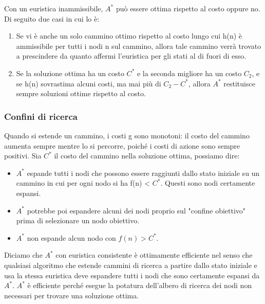 \documentclass{article}
\begin{document}
\noindent Con un euristica inammissibile, $A^*$ può essere ottima rispetto al costo oppure no. Di seguito due casi in cui lo è: 
\begin{enumerate}
    \item Se vi è anche un solo cammino ottimo rispetto al costo lungo cui h(n) è ammissibile per tutti i nodi n sul cammino, allora tale cammino verrà trovato a prescindere da quanto affermi l'euristica per gli stati al di fuori di esso. 
    \item Se la soluzione ottima ha un costo $C^*$ e la seconda migliore ha un costo $C_2$, e se h(n) sovrastima alcuni costi, ma mai più di $C_2-C^*$, allora $A^*$ restituisce sempre soluzioni ottime rispetto al costo.
\end{enumerate}
\newpage
\subsubsection{Confini di ricerca}
Quando si estende un cammino, i costi g sono monotoni: il costo del cammino aumenta sempre mentre lo si percorre, poiché i costi di azione sono sempre positivi. \newline
Sia $C^*$ il costo del cammino nella soluzione ottima, possiamo dire:
\begin{itemize}
    \item $A^*$ espande tutti i nodi che possono essere raggiunti dallo stato iniziale su un cammino in cui per ogni nodo si ha f(n) < $C^*$. Questi sono nodi certamente espansi.
    \item $A^*$ potrebbe poi espandere alcuni dei nodi proprio sul "confine obiettivo" prima di selezionare un nodo obiettivo.
    \item $A^*$ non espande alcun nodo con $f(n)>C^*$.
\end{itemize}
Diciamo che $A^*$ con euristica consistente è ottimamente efficiente nel senso che qualsiasi algoritmo che estende cammini di ricerca a partire dallo stato iniziale e usa la stessa euristica deve espandere tutti i nodi che sono certamente espansi da $A^*$.\newline
$A^*$ è efficiente perché esegue la potatura dell'albero di ricerca dei nodi non necessari per trovare una soluzione ottima.
\newpage
\end{document}
